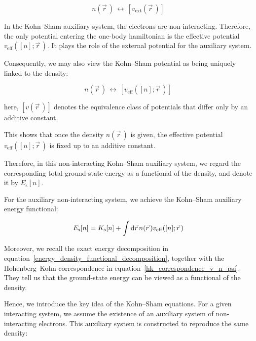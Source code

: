 \begin{equation}
    n(\vec{r}\,)
    \,\longleftrightarrow\,
    \left[v_\mathrm{ext}(\vec{r}\,)\right]
\label{HK_density_potential_correspondence}
\end{equation}

In the Kohn--Sham auxiliary system, the electrons are non-interacting.
Therefore, the only potential entering the one-body hamiltonian is the effective potential $v_\mathrm{eff}([n];\vec{r}\,)$.
It plays the role of the external potential for the auxiliary system.

Consequently, we may also view the Kohn--Sham potential as being uniquely linked to the density:

\begin{equation}
    n(\vec{r}\,)
    \,\longleftrightarrow\,
    \left[v_\mathrm{eff}([n];\vec{r}\,)\right]
\label{KS_density_potential_correspondence}
\end{equation}

here, $\left[v(\vec{r}\,)\right]$ denotes the equivalence class of potentials that differ only by an additive constant.

This shows that once the density $n(\vec{r}\,)$ is given, the effective potential $v_\mathrm{eff}([n];\vec{r}\,)$ is fixed up to an additive constant.

Therefore, in this non-interacting Kohn--Sham auxiliary system, we regard the corresponding total ground-state energy as a functional of the density, and denote it by $E_\mathrm{s}[n]$.

For the auxiliary non-interacting system, we achieve the Kohn--Sham auxiliary energy functional:

\begin{equation}
    E_\mathrm{s}[n]=K_\mathrm{s}[n]+\int\mathrm{d}{\vec{r}}\,n(\vec{r}\,)v_\mathrm{eff}([n];\vec{r}\,)
\label{KS_auxiliary_energy_functional}
\end{equation}

Moreover, we recall the exact energy decomposition in equation~\eqref{energy_density_functional_decomposition},
together with the Hohenberg--Kohn correspondence in equation~\eqref{hk_correspondence_v_n_psi}.
They tell us that the ground-state energy can be viewed as a functional of the density.

Hence, we introduce the key idea of the Kohn--Sham equations.
For a given interacting system, we assume the existence of an auxiliary system of non-interacting electrons.
This auxiliary system is constructed to reproduce the same density:

